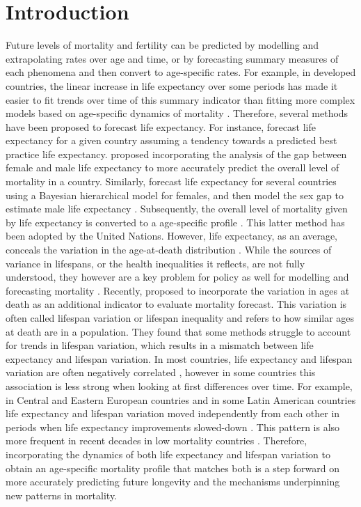 \documentclass[a4paper,twoside, openright, 12pt, leqno]{article}
\begin{document}
\section{Introduction}
Future levels of mortality and fertility can be predicted by modelling and extrapolating rates over age and time, or by forecasting summary measures of each phenomena and then convert to age-specific rates. For example, in developed countries, the linear increase in life expectancy over some periods has made it easier to fit trends over time of this summary indicator than fitting more complex models based on age-specific dynamics of mortality \citep{White200259}. Therefore, several methods have been proposed to forecast life expectancy. For instance, \citet{torri2012forecasting} forecast life expectancy for a given country assuming a tendency towards a predicted best practice life expectancy. \citet{pascariu2018double} proposed incorporating the analysis of the gap between female and male life expectancy to more accurately predict the overall level of mortality in a country. Similarly, \citet{Raftery2013} forecast life expectancy for several countries using a Bayesian hierarchical model for females, and then model the sex gap to estimate male life expectancy \citep{raftery2014joint}. Subsequently, the overall level of mortality given by life expectancy is converted to a age-specific profile \citep{vsevvcikova2016age}. This latter method has been adopted by the United Nations. However, life expectancy, as an average, conceals the variation in the age-at-death distribution \citep{van2018case}. While the sources of variance in lifespans, or the health inequalities it reflects, are not fully understood, they however are a key problem for policy as well for modelling and forecasting mortality \citep{tuljapurkar2011variance}. Recently, \citet{bohk2017lifespan} proposed to incorporate the variation in ages at death as an additional indicator to evaluate mortality forecast. This variation is often called lifespan variation or lifespan inequality and refers to how similar ages at death are in a population.
They found that some methods struggle to account for trends in lifespan variation, which results in a mismatch between life expectancy and lifespan variation. In most countries, life expectancy and lifespan variation are often negatively correlated \citep{Smits2009,Vaupel2011,colchero2016emergence, alvarez2019latin, gonzaga2018compression}, however in some countries this association is less strong when looking at first differences over time. For example, in Central and Eastern European countries and in some Latin American countries life expectancy and lifespan variation moved independently from each other in periods when life expectancy improvements slowed-down \citep{Aburto2018Eastern,aburto2019upsurge,garcia2019impact}. This pattern is also more frequent in recent decades in low mortality countries \citep{aburtoDynamics2019}. Therefore, incorporating the dynamics of both life expectancy and lifespan variation to obtain an age-specific mortality profile that matches both is a step forward on more accurately predicting future longevity and the mechanisms underpinning new patterns in mortality.
\end{document}
